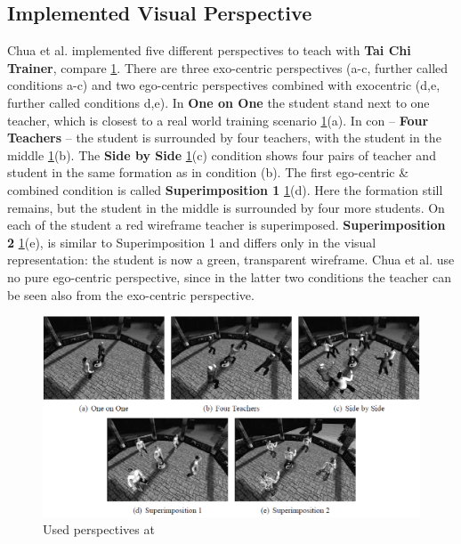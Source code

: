 \subsection{Implemented Visual Perspective}
Chua et al. \cite{Chua2003} implemented five different perspectives to teach with \textbf{Tai Chi Trainer}, compare \ref{fig:taichiperspectives}. There are three exo-centric perspectives (a-c, further called conditions a-c) and two ego-centric perspectives combined with exocentric (d,e, further called conditions d,e). In \textbf{One on One} the student stand next to one teacher, which is closest to a real world training scenario \ref{fig:taichiperspectives}(a). In con \--- \textbf{Four Teachers} \--- the student is surrounded by four teachers, with the student in the middle \ref{fig:taichiperspectives}(b). The \textbf{Side by Side} \ref{fig:taichiperspectives}(c) condition shows four pairs of teacher and student in the same formation as in condition (b). The first ego-centric \& combined condition is called \textbf{Superimposition 1} \ref{fig:taichiperspectives}(d). Here the formation still remains, but the student in the middle is surrounded by four more students. On each of the student a red wireframe teacher is superimposed. \textbf{Superimposition 2} \ref{fig:taichiperspectives}(e), is similar to Superimposition 1 and differs only in the visual representation: the student is now a green, transparent wireframe. Chua et al. use no pure ego-centric perspective, since in the latter two conditions the teacher can be seen also from the exo-centric perspective.
\begin{figure}
	\centering
	\includegraphics[width=1.0\textwidth]{img/taichi_perspectives.png}
	\caption{Used perspectives at \cite{Chua2003}}
	\label{fig:taichiperspectives}
\end{figure}\\
